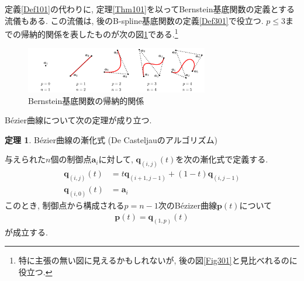 \documentclass{jsarticle}
\theoremstyle{definition}%
\newtheorem{thm}{定理}
\begin{document}
定義\ref{Def101}の代わりに, 定理\ref{Thm101}を以ってBernstein基底関数の定義とする流儀もある.
この流儀は, 後のB-spline基底関数の定義\ref{Def301}で役立つ.
$p\le 3$までの帰納的関係を表したものが次の図\ref{Fig102}である.\footnote{特に主張の無い図に見えるかもしれないが, 後の図\ref{Fig301}と見比べれるのに役立つ.}
\begin{figure}[H]
	\centering
    \includegraphics[page=2,clip,width=80mm]{fig.pdf}
	\caption{Bernstein基底関数の帰納的関係}
	\label{Fig102}
\end{figure}
B\'ezier曲線について次の定理が成り立つ.
\begin{screen}
	\begin{thm}
		\label{Thm105}
		B\'ezier曲線の漸化式 (De Casteljauのアルゴリズム)

        与えられた$n$個の制御点$\bm{a}_i$に対して, $\bm{q}_{(i,j)}(t)$を次の漸化式で定義する.
		\begin{align}
			\bm{q}_{(i,j)}(t)&=t\bm{q}_{(i+1,j-1)}+(1-t)\bm{q}_{(i,j-1)} \\
			\bm{q}_{(i,0)}(t)&=\bm{a}_i
		\end{align}
		このとき, 制御点から構成される$p=n-1$次のB\'{e}zizer曲線$\bm{p}(t)$について
		\begin{align}
			\label{Eqn105}
			\bm{p}(t)=\bm{q}_{(1,p)}(t)
		\end{align}
		が成立する.
	\end{thm}
\end{screen}
\end{document}
